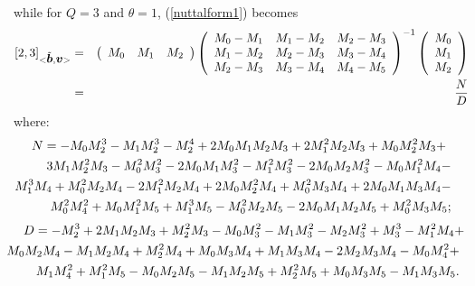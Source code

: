 while for $Q=3$ and $\theta=1$, (\ref{nuttalform1}) becomes
\begin{eqnarray} \label{pade23}
	{[2,3]}_{<\tilde{\mbox{\boldmath$\mit b$\unboldmath}},{\mbox{\boldmath$\mit v$\unboldmath}}>} & = & 
\left({\begin{array}{ccc}{M}_{0}&{M}_{1}&{M}_{2}\end{array}}\right){\left({\begin{array}{ccc}{M}_{0}-{M}_{1}&{M}_{1}-{M}_{2}&{M}_{2}-{M}_{3}\\ 


{M}_{1}-{M}_{2}&{M}_{2}-{M}_{3}&{M}_{3}-{M}_{4}\\ 
{M}_{2}-{M}_{3}&{M}_{3}-{M}_{4}&{M}_{4}-{M}_{5}\end{array}}\right)}^{-1}\left({\begin{array}{c}{M}_{0}\\ 


{M}_{1}\\ {M}_{2}\end{array}}\right) \nonumber\\
	 & = & \frac{N}{D}
\end{eqnarray}
where:
\begin{eqnarray}
\lefteqn{N=- M_{0} M_{2}^3   -  M_{1} M_{2}^3 - 
   M_{2}^4 + 2 M_{0} M_{1} M_{2} M_{3} + 
  2 M_{1}^2 M_{2} M_{3} +  M_{0} M_{2}^2 M_{3} +}\nonumber\\
&&\!\!\!\!\!\!\!\!\!\!\!\!\!\!
 3 M_{1} M_{2}^2 M_{3} -  M_{0}^2 M_{3}^2 - 
  2 M_{0} M_{1} M_{3}^2 -  M_{1}^2 M_{3}^2 - 
  2 M_{0} M_{2} M_{3}^2 -  M_{0} M_{1}^2 M_{4} - \nonumber\\
&& \!\!\!\!\!\!\!\!\!\!\!\!\!\! 
   M_{1}^3 M_{4} +  M_{0}^2 M_{2} M_{4} - 
  2 M_{1}^2 M_{2} M_{4} + 2 M_{0} M_{2}^2 M_{4} + 
   M_{0}^2 M_{3} M_{4} + 2 M_{0} M_{1} M_{3} M_{4} -\nonumber\\
&&\!\!\!\!\!\!\!\!\!\!\!\!\!\!
 M_{0}^2 M_{4}^2 +  M_{0} M_{1}^2 M_{5} + 
   M_{1}^3 M_{5} -  M_{0}^2 M_{2} M_{5} - 
  2 M_{0} M_{1} M_{2} M_{5} +  M_{0}^2 M_{3} M_{5};
\end{eqnarray}
\begin{eqnarray}
\lefteqn{D=  - M_{2}^3 + 2 M_{1} M_{2} M_{3} +  M_{2}^2 M_{3} - 
   M_{0} M_{3}^2 -  M_{1} M_{3}^2 -  M_{2} M_{3}^2 + 
   M_{3}^3 -  M_{1}^2 M_{4} +   }\nonumber\\
&&\!\!\!\!\!\!\!\!\!\!\!\!\!\!
 M_{0} M_{2} M_{4} - M_{1} M_{2} M_{4} +  M_{2}^2 M_{4} + 
   M_{0} M_{3} M_{4} +  M_{1} M_{3} M_{4} - 
  2 M_{2} M_{3} M_{4} -  M_{0} M_{4}^2 + \nonumber\\
&&\!\!\!\!\!\!\!\!\!\!\!\!\!\!
 M_{1} M_{4}^2 +  M_{1}^2 M_{5} -  M_{0} M_{2} M_{5} - 
   M_{1} M_{2} M_{5} +  M_{2}^2 M_{5} + 
   M_{0} M_{3} M_{5} -  M_{1} M_{3} M_{5}.
\end{eqnarray}

